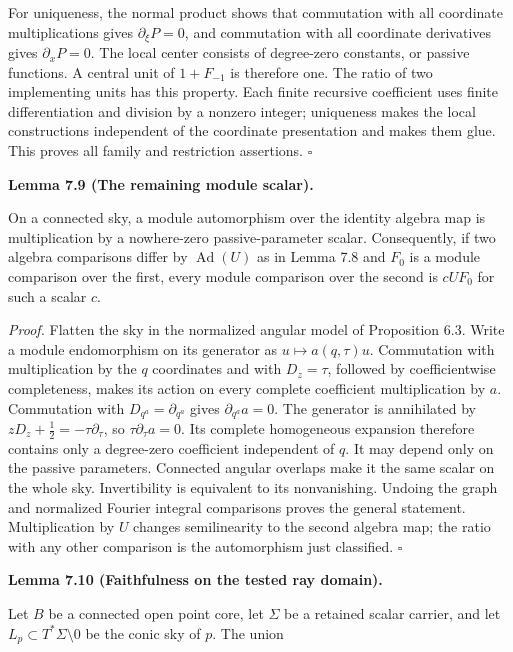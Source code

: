 \documentclass[
  english,
  11pt,
  reqno]{amsart}
\makeatletter
\newcommand{\pandocstatementheading}[1]{%
  \par\addpenalty{\@beginparpenalty}%
  \addvspace{.5\baselineskip plus .2\baselineskip minus .2\baselineskip}%
  {\normalfont\bfseries #1\par}%
  \nobreak\@afterindenttrue\@afterheading
}
\makeatother
\begin{document}
For uniqueness, the normal product shows that commutation with all
coordinate multiplications gives \(\partial_\xi P=0\), and commutation
with all coordinate derivatives gives \(\partial_xP=0\). The local
center consists of degree-zero constants, or passive functions. A
central unit of \(1+F_{-1}\) is therefore one. The ratio of two
implementing units has this property. Each finite recursive coefficient
uses finite differentiation and division by a nonzero integer;
uniqueness makes the local constructions independent of the coordinate
presentation and makes them glue. This proves all family and restriction
assertions. \hfill\(\square\)

\pandocstatementheading{\leavevmode{}\label{lem:online-module-comparison-scalar}Lemma 7.9 (The remaining module scalar).}

On a connected sky, a module automorphism over the identity algebra map
is multiplication by a nowhere-zero passive-parameter scalar.
Consequently, if two algebra comparisons differ by
\(\operatorname{Ad}(U)\) as in Lemma 7.8 and \(F_0\) is a module
comparison over the first, every module comparison over the second is
\(cUF_0\) for such a scalar \(c\).

\emph{Proof.} Flatten the sky in the normalized angular model of
Proposition 6.3. Write a module endomorphism on its generator as
\(u\mapsto a(q,\tau)u\). Commutation with multiplication by the \(q\)
coordinates and with \(D_z=\tau\), followed by coefficientwise
completeness, makes its action on every complete coefficient
multiplication by \(a\). Commutation with \(D_{q^a}=\partial_{q^a}\)
gives \(\partial_{q^a}a=0\). The generator is annihilated by
\(zD_z+\tfrac12=-\tau\partial_\tau\), so \(\tau\partial_\tau a=0\). Its
complete homogeneous expansion therefore contains only a degree-zero
coefficient independent of \(q\). It may depend only on the passive
parameters. Connected angular overlaps make it the same scalar on the
whole sky. Invertibility is equivalent to its nonvanishing. Undoing the
graph and normalized Fourier integral comparisons proves the general
statement. Multiplication by \(U\) changes semilinearity to the second
algebra map; the ratio with any other comparison is the automorphism
just classified. \hfill\(\square\)

\pandocstatementheading{\leavevmode{}\label{lem:online-full-point-family-faithfulness}Lemma 7.10 (Faithfulness on the tested ray domain).}

Let \(B\) be a connected open point core, let \(\Sigma\) be a retained
scalar carrier, and let \(L_p\subset T^*\Sigma\setminus0\) be the conic
sky of \(p\). The union
\end{document}
